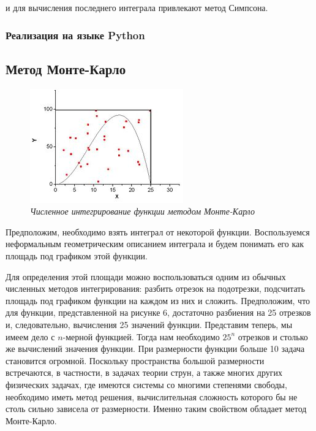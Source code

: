\documentclass[a4paper]{article}
\begin{document}
{{{{{{{{и для вычисления последнего интеграла привлекают метод Симпсона.

\subsubsection{Реализация на языке Python}



\newpage
\subsection{Метод Монте-Карло}

\begin{figure}
\includegraphics[width=0.9\linewidth]{images/monte_carlo.jpeg}
\caption{\textit{Численное интегрирование функции методом Монте-Карло}}
\label{fig:wrapfig_1}
\end{figure}

Предположим, необходимо взять интеграл от некоторой функции. Воспользуемся неформальным геометрическим описанием интеграла и будем понимать его как площадь под графиком этой функции.

Для определения этой площади можно воспользоваться одним из обычных численных методов интегрирования: разбить отрезок на подотрезки, подсчитать площадь под графиком функции на каждом из них и сложить. Предположим, что для функции, представленной на рисунке 6, достаточно разбиения на 25 отрезков и, следовательно, вычисления 25 значений функции. Представим теперь, мы имеем дело с $n$-мерной функцией. Тогда нам необходимо $25^n$ отрезков и столько же вычислений значения функции. При размерности функции больше 10 задача становится огромной. Поскольку пространства большой размерности встречаются, в частности, в задачах теории струн, а также многих других физических задачах, где имеются системы со многими степенями свободы, необходимо иметь метод решения, вычислительная сложность которого бы не столь сильно зависела от размерности. Именно таким свойством обладает метод Монте-Карло.

}}}}}}}}
\end{document}
